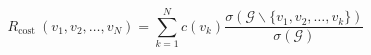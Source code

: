 \begin{equation}
    R_{\text {cost }}(v_1, v_2, \ldots, v_N)=\sum_{k=1}^N c(v_k)\frac{\sigma(\mathcal{G} \backslash\{v_1, v_2, \ldots, v_k\})}{\sigma(\mathcal{G})}
    \label{formula:有拆除代价的ANC}
\end{equation}

